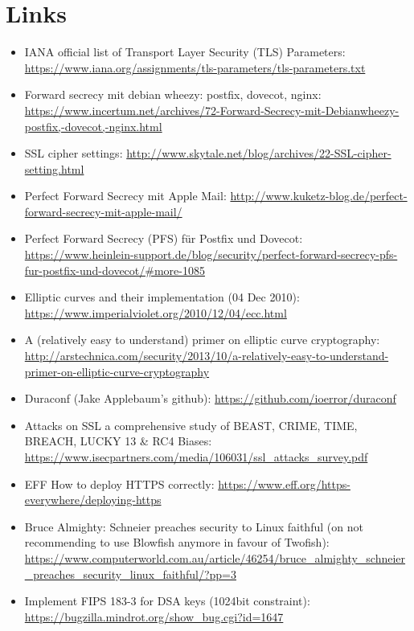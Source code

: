 \section{Links}
\label{section:Links}


\begin{itemize}
\item IANA official list of Transport Layer Security (TLS) Parameters: \url{https://www.iana.org/assignments/tls-parameters/tls-parameters.txt}
\item Forward secrecy mit debian wheezy: postfix, dovecot, nginx: \url{https://www.incertum.net/archives/72-Forward-Secrecy-mit-Debianwheezy-postfix,-dovecot,-nginx.html}
\item SSL cipher settings: \url{http://www.skytale.net/blog/archives/22-SSL-cipher-setting.html}
\item Perfect Forward Secrecy mit Apple Mail: \url{http://www.kuketz-blog.de/perfect-forward-secrecy-mit-apple-mail/}
\item Perfect Forward Secrecy (PFS) f\"ur Postfix und Dovecot: \url{https://www.heinlein-support.de/blog/security/perfect-forward-secrecy-pfs-fur-postfix-und-dovecot/#more-1085}
\item Elliptic curves and their implementation (04 Dec 2010): \url{https://www.imperialviolet.org/2010/12/04/ecc.html}
\item A (relatively easy to understand) primer on elliptic curve cryptography: \url{http://arstechnica.com/security/2013/10/a-relatively-easy-to-understand-primer-on-elliptic-curve-cryptography}
\item Duraconf (Jake Applebaum's github): \url{https://github.com/ioerror/duraconf}
\item Attacks on SSL a comprehensive study of BEAST, CRIME, TIME, BREACH, LUCKY 13 \& RC4 Biases: \url{https://www.isecpartners.com/media/106031/ssl_attacks_survey.pdf}
\item EFF How to deploy HTTPS correctly: \url{https://www.eff.org/https-everywhere/deploying-https}
\item Bruce Almighty: Schneier preaches security to Linux faithful (on not recommending to use Blowfish anymore in favour of Twofish): \url{https://www.computerworld.com.au/article/46254/bruce_almighty_schneier_preaches_security_linux_faithful/?pp=3}
\item Implement FIPS 183-3 for DSA keys (1024bit constraint): \url{https://bugzilla.mindrot.org/show_bug.cgi?id=1647}

\end{itemize}
